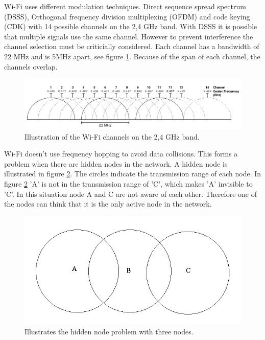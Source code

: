\documentclass[10pt,a4paper]{article}
\begin{document}
Wi-Fi uses different modulation techniques. Direct sequence spread spectrum (DSSS), Orthogonal frequency division multiplexing (OFDM) and code keying (CDK) with 14 possible channels on the 2,4 GHz band. With DSSS it is possible that multiple signals use the same channel. However to prevent interference the channel selection must be criticially considered. Each channel has a bandwidth of 22 MHz and is 5MHz apart, see figure \ref{fig:wifichannels}. \cite{combook} Because of the span of each channel, the channels overlap.

\begin{figure}[H]
   \centering
   \includegraphics[width=1\textwidth]{wifichannels}
   \caption{Illustration of the Wi-Fi channels on the 2,4 GHz band. \cite{wifichannels}}
   \label{fig:wifichannels}
\end{figure}

Wi-Fi doesn't use frequency hopping to avoid data collisions. This forms a problem when there are hidden nodes in the network. A hidden node is illustrated in figure \ref{fig:hiddennode}. The circles indicate the transmission range of each node. In figure \ref{fig:hiddennode} 'A' is not in the transmission range of 'C', which makes 'A' invisible to 'C'. In this situation node A and C are not aware of each other. Therefore one of the nodes can think that it is the only active node in the network.

\begin{figure}[H]
   \centering
   \includegraphics[width=1\textwidth]{hiddennodeproblem}
   \caption{Illustrates the hidden node problem with three nodes.}
   \label{fig:hiddennode}
\end{figure}
\end{document}
